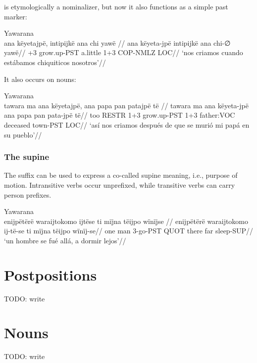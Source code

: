 \documentclass{article}
\begin{document}
 is etymologically a nominalizer, but now it also functions as
a simple past marker:

\ex Yawarana \\
\label{anfoperso-02}\begingl
\glpreamble  ana këyetajpë, intipijkë ana chi yawë //
\gla ana këyeta-jpë intipijkë ana chi-∅ yawë//
+3 grow.up-PST a.little 1+3 COP-NMLZ LOC//
\glft ‘nos criamos cuando estábamos chiquiticos nosotros’//  
\endgl 
\xe

It also occurs on nouns:

\ex Yawarana \\
\label{anfoperso-17}\begingl
\glpreamble  tawara ma ana këyetajpë, ana papa pan patajpë të //
\gla tawara ma ana këyeta-jpë ana papa pan pata-jpë të//
\glb too RESTR 1+3 grow.up-PST 1+3 father:VOC deceased town-PST LOC//
\glft ‘así nos criamos después de que se murió mi papá en su pueblo’//  
\endgl 
\xe

\subsubsection{The supine}

The suffix  can be used to express a co-called supine meaning,
i.e., purpose of motion. Intransitive verbs occur unprefixed, while
transitive verbs can carry person prefixes.

\ex Yawarana \\
\label{ctorat-03}\begingl
\glpreamble  enijpëtërë waraijtokomo ijtëse ti mïjna tëijpo wïnïjse //
\gla enijpëtërë waraijtokomo ij-të-se ti mïjna tëijpo wïnïj-se//
\glb one man 3-go-PST QUOT there far sleep-SUP//
\glft ‘un hombre se fué allá, a dormir lejos’//  
\endgl 
\xe

\section{Postpositions}

TODO: write

\section{Nouns}

TODO: write

\printbibliography
\end{document}
